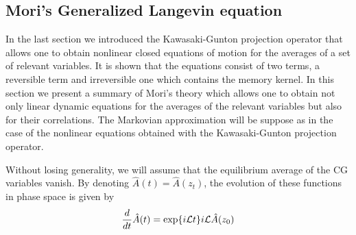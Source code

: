 \documentclass[b5paper,openright,10pt]{book}
\begin{document}
\subsection{Mori's Generalized Langevin equation}
\label{Sec:Mori}
In the last section we introduced the Kawasaki-Gunton projection operator that allows one to obtain nonlinear closed equations of motion for the averages of a set of relevant variables. It is shown that the equations consist of two terms, a reversible term and irreversible one which contains the memory kernel. 
In this section we present a summary of Mori's theory \cite{Mori1965} which allows one to obtain not only linear dynamic equations for the averages of the relevant variables but also for their correlations. The Markovian approximation will be suppose as in the case of the nonlinear equations obtained with the Kawasaki-Gunton projection operator. 

Without  losing  generality,  we  will assume  that  the  equilibrium
average   of    the   CG    variables   vanish.    By    denoting  
$\hat{A}(t)=\hat{A}(z_t)$, the  evolution of these functions  in phase
space is given by
\begin{eqnarray}
\frac{d}{dt}{\hat{A}}(t)=\exp\{i{\cal L}t\}i{\cal L}\hat{A}(z_0)
\label{LA}
\end{eqnarray}

\end{document}
